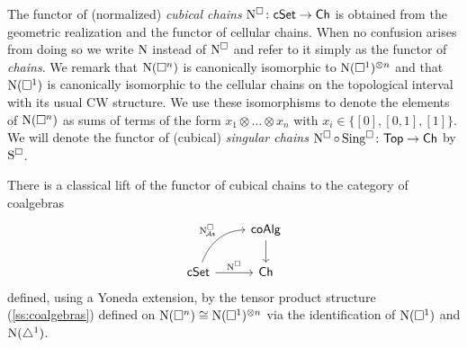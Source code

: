 The functor of (normalized) \textit{cubical chains} $\operatorname{N^{\square}} \colon \mathsf{cSet} \to \mathsf{Ch}$ is obtained from the geometric realization and the functor of cellular chains.
When no confusion arises from doing so we write $\operatorname{N}$ instead of $\operatorname{N^{\square}}$ and refer to it simply as the functor of \textit{chains}.
We remark that $\operatorname{N}(\square^n)$ is canonically isomorphic to $\operatorname{N}(\square^1)^{\otimes n}$ and that $\operatorname{N}(\square^1)$ is canonically isomorphic to the cellular chains on the topological interval with its usual CW structure.
We use these isomorphisms to denote the elements of $\operatorname{N}(\square^n)$ as sums of terms of the form $x_1 \otimes \dots \otimes x_n$ with $x_i \in \big\{[0], [0,1], [1] \big\}$.
We will denote the functor of (cubical) \textit{singular chains} $\operatorname{N^{\square}} \circ \operatorname{Sing^{\square}} \colon \mathsf{Top} \to \mathsf{Ch}$ by $\operatorname{S^{\square}}$.

There is a classical lift of the functor of cubical chains to the category of coalgebras
\[
\begin{tikzcd}
	& \coAlg \arrow[d] \\
	\cSet \arrow[r, "\cchains"] \arrow[ur, "\cchainsA", out=70, in=180] & \Ch
\end{tikzcd}
\]
defined, using a Yoneda extension, by the tensor product structure (\cref{ss:coalgebras}) defined on $\operatorname{N}(\square^n) \cong \operatorname{N}(\square^1)^{\otimes n}$ via the identification of $\operatorname{N}(\square^1)$ and $\operatorname{N}(\triangle^1)$.

%
%


